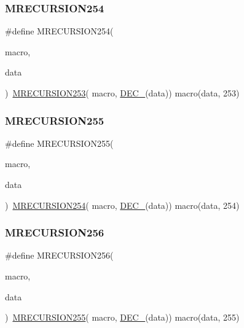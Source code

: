 \subsubsection{\texorpdfstring{MRECURSION254}{MRECURSION254}}
{\footnotesize\ttfamily \#define M\+R\+E\+C\+U\+R\+S\+I\+O\+N254(\begin{DoxyParamCaption}\item[{}]{macro,  }\item[{}]{data }\end{DoxyParamCaption})~\mbox{\hyperlink{group__group__sam0__utils__mrecursion_ga996e4e7d2feb306157f1bfec60e6b038}{M\+R\+E\+C\+U\+R\+S\+I\+O\+N253}}(  macro, \mbox{\hyperlink{group__group__sam0__utils__mrecursion_ga1d23d683797679dca8c3512a54a5dcae}{D\+E\+C\+\_\+}}(data))   macro(data, 253)}

\mbox{\label{group__group__sam0__utils__mrecursion_ga0f52c151840f0c79f10ae7fb8678ae09}} 
\subsubsection{\texorpdfstring{MRECURSION255}{MRECURSION255}}
{\footnotesize\ttfamily \#define M\+R\+E\+C\+U\+R\+S\+I\+O\+N255(\begin{DoxyParamCaption}\item[{}]{macro,  }\item[{}]{data }\end{DoxyParamCaption})~\mbox{\hyperlink{group__group__sam0__utils__mrecursion_gaa9e7658b8125d6cb42ca97f8c227d903}{M\+R\+E\+C\+U\+R\+S\+I\+O\+N254}}(  macro, \mbox{\hyperlink{group__group__sam0__utils__mrecursion_ga1d23d683797679dca8c3512a54a5dcae}{D\+E\+C\+\_\+}}(data))   macro(data, 254)}

\mbox{\label{group__group__sam0__utils__mrecursion_ga9d50ce6a1db91a8542646efec93051a3}} 
\subsubsection{\texorpdfstring{MRECURSION256}{MRECURSION256}}
{\footnotesize\ttfamily \#define M\+R\+E\+C\+U\+R\+S\+I\+O\+N256(\begin{DoxyParamCaption}\item[{}]{macro,  }\item[{}]{data }\end{DoxyParamCaption})~\mbox{\hyperlink{group__group__sam0__utils__mrecursion_ga0f52c151840f0c79f10ae7fb8678ae09}{M\+R\+E\+C\+U\+R\+S\+I\+O\+N255}}(  macro, \mbox{\hyperlink{group__group__sam0__utils__mrecursion_ga1d23d683797679dca8c3512a54a5dcae}{D\+E\+C\+\_\+}}(data))   macro(data, 255)}

